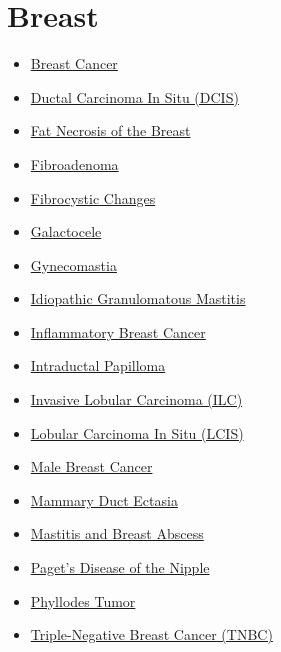 \section*{Breast}
\label{sec:organ_breast}
\begin{itemize}[noitemsep]
  \item \hyperlink{sec:Breast Cancer}{Breast Cancer}
  \item \hyperlink{sec:Ductal Carcinoma In Situ (DCIS)}{Ductal Carcinoma In Situ (DCIS)}
  \item \hyperlink{sec:Fat Necrosis of the Breast}{Fat Necrosis of the Breast}
  \item \hyperlink{sec:Fibroadenoma}{Fibroadenoma}
  \item \hyperlink{sec:Fibrocystic Changes}{Fibrocystic Changes}
  \item \hyperlink{sec:Galactocele}{Galactocele}
  \item \hyperlink{sec:Gynecomastia}{Gynecomastia}
  \item \hyperlink{sec:Idiopathic Granulomatous Mastitis}{Idiopathic Granulomatous Mastitis}
  \item \hyperlink{sec:Inflammatory Breast Cancer}{Inflammatory Breast Cancer}
  \item \hyperlink{sec:Intraductal Papilloma}{Intraductal Papilloma}
  \item \hyperlink{sec:Invasive Lobular Carcinoma (ILC)}{Invasive Lobular Carcinoma (ILC)}
  \item \hyperlink{sec:Lobular Carcinoma In Situ (LCIS)}{Lobular Carcinoma In Situ (LCIS)}
  \item \hyperlink{sec:Male Breast Cancer}{Male Breast Cancer}
  \item \hyperlink{sec:Mammary Duct Ectasia}{Mammary Duct Ectasia}
  \item \hyperlink{sec:Mastitis and Breast Abscess}{Mastitis and Breast Abscess}
  \item \hyperlink{sec:Paget's Disease of the Nipple}{Paget's Disease of the Nipple}
  \item \hyperlink{sec:Phyllodes Tumor}{Phyllodes Tumor}
  \item \hyperlink{sec:Triple-Negative Breast Cancer (TNBC)}{Triple-Negative Breast Cancer (TNBC)}
\end{itemize}

